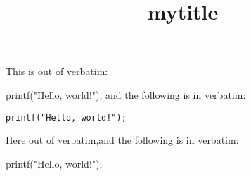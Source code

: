 \documentclass[10pt,titlepage]{report} %
\begin{document}
\title{mytitle} %

This is out of verbatim:

printf("Hello, world!");
and the following is in verbatim:
\begin{verbatim}
printf("Hello, world!");
\end{verbatim}

Here out of verbatim,and the following is in verbatim:
\begin{verbatim*}
printf("Hello, world!");
\end{verbatim*}
\end{document}
